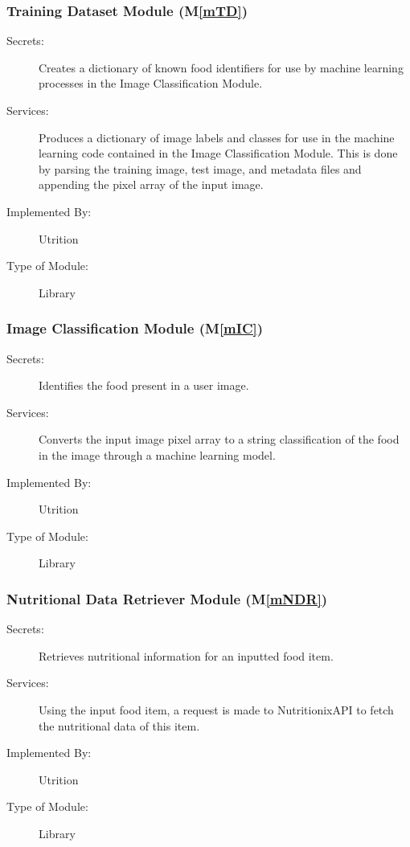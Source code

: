 \documentclass[12pt, titlepage]{article}
\newcommand{\mref}[1]{M\ref{#1}}
\begin{document}
\subsubsection{Training Dataset Module (\mref{mTD})}

\begin{description}
	\item[Secrets:] Creates a dictionary of known food identifiers for use by machine learning processes in the Image Classification Module.
	\item[Services:] Produces a dictionary of image labels and classes for use in the machine learning code contained in the Image Classification Module. This is done by parsing the training image, test image, and metadata files and appending the pixel array of the input image.
	\item[Implemented By:] Utrition
	\item[Type of Module:] Library
\end{description}

\subsubsection{Image Classification Module (\mref{mIC})}

\begin{description}
\item[Secrets:] Identifies the food present in a user image.
\item[Services:]Converts the input image pixel array to a string classification 
of the food in the image through a machine 
learning model.
\item[Implemented By:] Utrition
\item[Type of Module:] Library
\end{description}

\subsubsection{Nutritional Data Retriever Module (\mref{mNDR})}

\begin{description}
	\item[Secrets:]Retrieves nutritional information for an inputted food item.
	\item[Services:]Using the input food item, a request is made to NutritionixAPI to fetch the nutritional data of this item.
	\item[Implemented By:] Utrition
	\item[Type of Module:] Library
\end{description}
\end{document}
